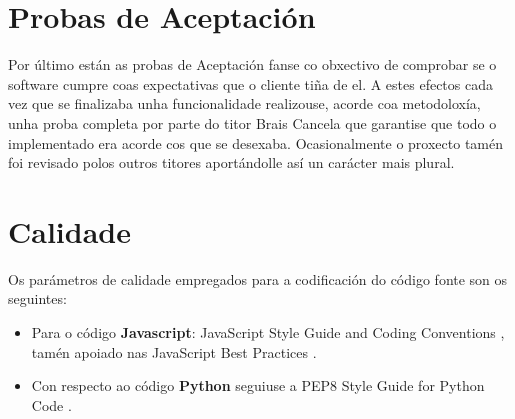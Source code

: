 \section{Probas de Aceptación}
    Por último están as probas de Aceptación fanse co obxectivo de comprobar se o software cumpre
    coas expectativas que o cliente tiña de el. A estes efectos cada vez que se finalizaba unha 
    funcionalidade realizouse, acorde coa metodoloxía, unha proba completa por parte do titor Brais 
    Cancela que garantise que todo o implementado era acorde cos que se desexaba. Ocasionalmente o 
    proxecto tamén foi revisado polos outros titores aportándolle así un carácter mais plural.
    

\section{Calidade}
	Os parámetros de calidade empregados para a codificación do código fonte son os seguintes:
    \begin{itemize}
     \item Para o código \textbf{Javascript}: JavaScript Style Guide and Coding Conventions 
     \cite{javascript-style-guide}, tamén apoiado nas JavaScript Best Practices 
     \cite{javascript-best-practices}.
     \item Con respecto ao código \textbf{Python} seguiuse a PEP8 Style Guide for Python Code
     \cite{pepe8-style-guide}.
    \end{itemize}